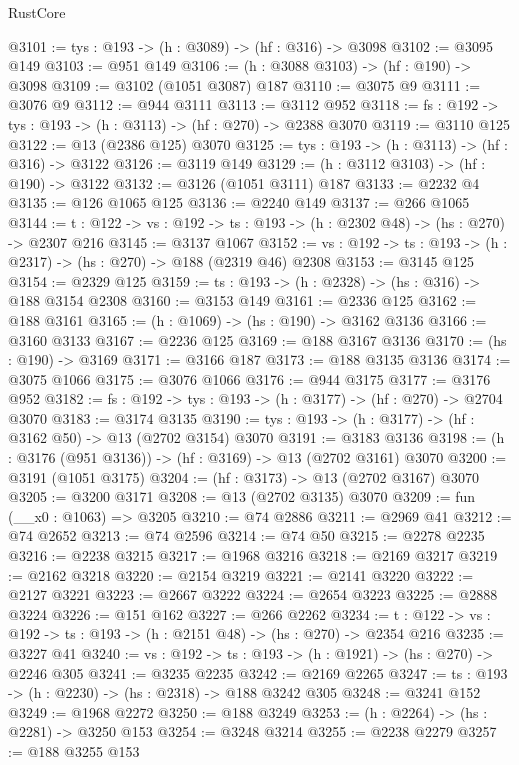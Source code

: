 \begin{lexlean}{RustCore}
\begin{coremodule}
@3101 := {tys : @193} -> (h : @3089) -> (hf : @316) -> @3098
@3102 := @3095 @149
@3103 := @951 @149
@3106 := (h : @3088 @3103) -> (hf : @190) -> @3098
@3109 := @3102 (@1051 @3087) @187
@3110 := @3075 @9
@3111 := @3076 @9
@3112 := @944 @3111
@3113 := @3112 @952
@3118 := {fs : @192} -> {tys : @193} -> (h : @3113) -> (hf : @270) -> @2388 @3070
@3119 := @3110 @125
@3122 := @13 (@2386 @125) @3070
@3125 := {tys : @193} -> (h : @3113) -> (hf : @316) -> @3122
@3126 := @3119 @149
@3129 := (h : @3112 @3103) -> (hf : @190) -> @3122
@3132 := @3126 (@1051 @3111) @187
@3133 := @2232 @4
@3135 := @126 @1065 @125
@3136 := @2240 @149
@3137 := @266 @1065
@3144 := {t : @122} -> {vs : @192} -> {ts : @193} -> (h : @2302 @48) -> (hs : @270) -> @2307 @216
@3145 := @3137 @1067
@3152 := {vs : @192} -> {ts : @193} -> (h : @2317) -> (hs : @270) -> @188 (@2319 @46) @2308
@3153 := @3145 @125
@3154 := @2329 @125
@3159 := {ts : @193} -> (h : @2328) -> (hs : @316) -> @188 @3154 @2308
@3160 := @3153 @149
@3161 := @2336 @125
@3162 := @188 @3161
@3165 := (h : @1069) -> (hs : @190) -> @3162 @3136
@3166 := @3160 @3133
@3167 := @2236 @125
@3169 := @188 @3167 @3136
@3170 := (hs : @190) -> @3169
@3171 := @3166 @187
@3173 := @188 @3135 @3136
@3174 := @3075 @1066
@3175 := @3076 @1066
@3176 := @944 @3175
@3177 := @3176 @952
@3182 := {fs : @192} -> {tys : @193} -> (h : @3177) -> (hf : @270) -> @2704 @3070
@3183 := @3174 @3135
@3190 := {tys : @193} -> (h : @3177) -> (hf : @3162 @50) -> @13 (@2702 @3154) @3070
@3191 := @3183 @3136
@3198 := (h : @3176 (@951 @3136)) -> (hf : @3169) -> @13 (@2702 @3161) @3070
@3200 := @3191 (@1051 @3175)
@3204 := (hf : @3173) -> @13 (@2702 @3167) @3070
@3205 := @3200 @3171
@3208 := @13 (@2702 @3135) @3070
@3209 := fun (__x0 : @1063) => @3205
@3210 := @74 @2886
@3211 := @2969 @41
@3212 := @74 @2652
@3213 := @74 @2596
@3214 := @74 @50
@3215 := @2278 @2235
@3216 := @2238 @3215
@3217 := @1968 @3216
@3218 := @2169 @3217
@3219 := @2162 @3218
@3220 := @2154 @3219
@3221 := @2141 @3220
@3222 := @2127 @3221
@3223 := @2667 @3222
@3224 := @2654 @3223
@3225 := @2888 @3224
@3226 := @151 @162
@3227 := @266 @2262
@3234 := {t : @122} -> {vs : @192} -> {ts : @193} -> (h : @2151 @48) -> (hs : @270) -> @2354 @216
@3235 := @3227 @41
@3240 := {vs : @192} -> {ts : @193} -> (h : @1921) -> (hs : @270) -> @2246 @305
@3241 := @3235 @2235
@3242 := @2169 @2265
@3247 := {ts : @193} -> (h : @2230) -> (hs : @2318) -> @188 @3242 @305
@3248 := @3241 @152
@3249 := @1968 @2272
@3250 := @188 @3249
@3253 := (h : @2264) -> (hs : @2281) -> @3250 @153
@3254 := @3248 @3214
@3255 := @2238 @2279
@3257 := @188 @3255 @153

\end{coremodule}
\end{lexlean}

